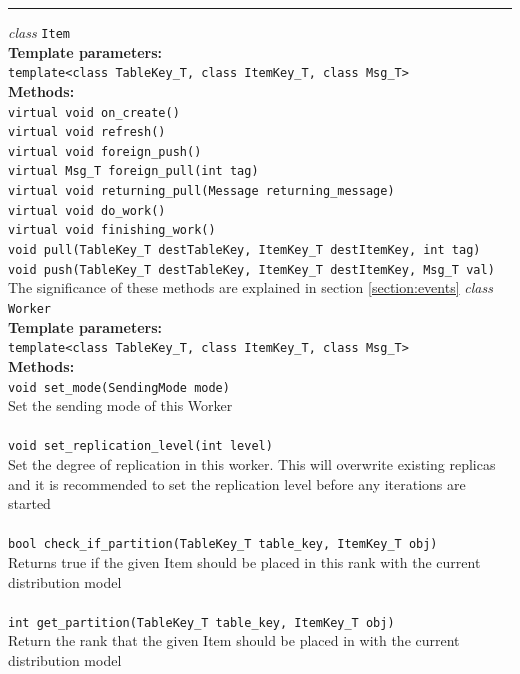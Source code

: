 \documentclass{uit-report}
\begin{document}
\begin{center}
	\noindent\rule{4cm}{1.2pt}
\end{center}

\textit{class} \texttt{Item}\\
\textbf{Template parameters:}\\
\phantom{11111} \texttt{template<class TableKey\_T, class ItemKey\_T, class Msg\_T>}\\
\textbf{Methods:}\\
\phantom{11111} \texttt{virtual void on\_create()}\\
\phantom{11111} \texttt{virtual void refresh()}\\
\phantom{11111} \texttt{virtual void foreign\_push()}\\
\phantom{11111} \texttt{virtual Msg\_T foreign\_pull(int tag)}\\
\phantom{11111} \texttt{virtual void returning\_pull(Message returning\_message)}\\
\phantom{11111} \texttt{virtual void do\_work()}\\
\phantom{11111} \texttt{virtual void finishing\_work()}\\
\phantom{11111} \texttt{void pull(TableKey\_T destTableKey, ItemKey\_T destItemKey, int tag)}
\phantom{11111} \texttt{void push(TableKey\_T destTableKey, ItemKey\_T destItemKey, Msg\_T val)}
The significance of these methods are explained in section \ref{section:events}
\newpage
\textit{class} \texttt{Worker}\\
\textbf{Template parameters:}\\
\phantom{11111} \texttt{template<class TableKey\_T, class ItemKey\_T, class Msg\_T>}\\
\textbf{Methods:}\\
\phantom{11111} \texttt{void set\_mode(SendingMode mode)}\\
\phantom{11111}\phantom{11111} Set the sending mode of this Worker\\\\
\phantom{11111} \texttt{void set\_replication\_level(int level)}\\
\phantom{11111}\phantom{11111} Set the degree of replication in this worker. This will overwrite existing replicas and it is recommended to set the replication level before any iterations are started\\\\
\phantom{11111} \texttt{bool check\_if\_partition(TableKey\_T table\_key, ItemKey\_T obj)}\\
\phantom{11111}\phantom{11111} Returns true if the given Item should be placed in this rank with the current distribution model\\\\
\phantom{11111} \texttt{int get\_partition(TableKey\_T table\_key, ItemKey\_T obj)}\\
\phantom{11111}\phantom{11111} Return the rank that the given Item should be placed in with the current distribution model\\\\

\end{document}
